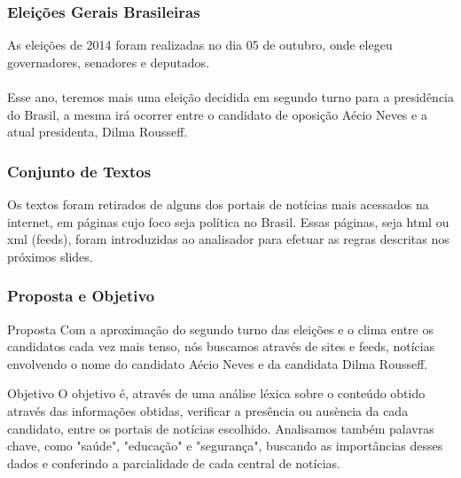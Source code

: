 
\begin{frame}
\frametitle{Eleições Gerais Brasileiras}
As eleições de 2014 foram realizadas no dia 05 de outubro, onde elegeu governadores, senadores e deputados.
\\~\\
Esse ano, teremos mais uma eleição decidida em segundo turno para a presidência do Brasil, a mesma irá ocorrer entre o candidato de oposição Aécio Neves e a atual presidenta, Dilma Rousseff.
\end{frame}


\begin{frame}
\frametitle{Conjunto de Textos}
Os textos foram retirados de alguns dos portais de notícias mais acessados na internet, em páginas cujo foco seja política no Brasil. Essas páginas, seja html ou xml (feeds), foram introduzidas ao analisador para efetuar as regras descritas nos próximos slides.
\end{frame}


\begin{frame}
\frametitle{Proposta e Objetivo}
\begin{block}{Proposta}
Com a aproximação do segundo turno das eleições e o clima entre os candidatos cada vez mais tenso, nós buscamos através de sites e feeds, notícias envolvendo o nome do candidato Aécio Neves e da candidata Dilma Rousseff.
\end{block}

\begin{block}{Objetivo}
O objetivo é, através de uma análise léxica sobre o conteúdo obtido através das informações obtidas, verificar a presência ou ausència da cada candidato, entre os portais de notícias escolhido. Analisamos também palavras chave, como "saúde", "educação" e "segurança", buscando as importâncias desses dados e conferindo a parcialidade de cada central de notícias.
\end{block}
\end{frame}

